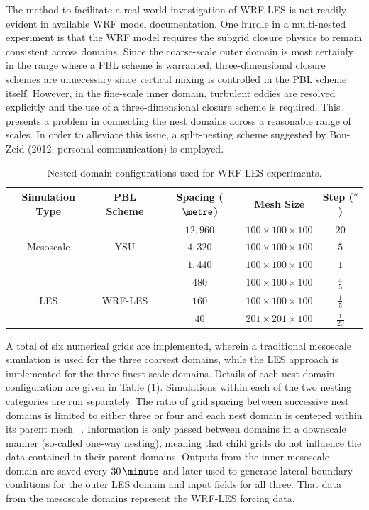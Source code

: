 The method to facilitate a real-world investigation of WRF-LES is not readily evident in available WRF model documentation. One hurdle in a multi-nested experiment is that the WRF model requires the subgrid closure physics to remain consistent across domains. Since the coarse-scale outer domain is most certainly in the range where a PBL scheme is warranted, three-dimensional closure schemes are unnecessary since vertical mixing is controlled in the PBL scheme itself. However, in the fine-scale inner domain, turbulent eddies are resolved explicitly and the use of a three-dimensional closure scheme is required. This presents a problem in connecting the nest domains across a reasonable range of scales. In order to alleviate this issue, a split-nesting scheme suggested by Bou-Zeid (2012, personal communication) is employed.


\begin{center}
\begin{table}[t]
\caption{Nested domain configurations used for WRF-LES experiments.}
\begin{center}
\begin{tabular}{  c  c  c  c  c }
\hline
\hline
\textbf{Simulation Type} & \textbf{PBL Scheme} & \textbf{Spacing ($\metre$)} & \textbf{Mesh Size} & \textbf{Step ($\second$)} \\ 
\hline
\multirow{3}{*}{Mesoscale} & & $12,960$ & $100\times100\times100$ & $20$ \\   
& YSU & $4,320$ & $100\times100\times100$ & $5$ \\
& & $1,440$ & $100\times100\times100$ & $1$ \\
\hline
\multirow{3}{*}{LES} &  & $480$ & $100\times100\times100$ & $\frac{4}{5}$ \\   
& WRF-LES & $160$ & $100\times100\times100$ & $\frac{1}{5}$ \\
&  & $40$ & $201\times201\times100$ & $\frac{1}{20}$ \\  
\hline
\hline
\end{tabular}
\end{center}
\label{table601}
\end{table}
\end{center}


A total of six numerical grids are implemented, wherein a traditional mesoscale simulation is used for the three coarsest domains, while the LES approach is implemented for the three finest-scale domains. Details of each nest domain configuration are given in Table (\ref{table601}). Simulations within each of the two nesting categories are run separately. The ratio of grid spacing between successive nest domains is limited to either three or four and each nest domain is centered within its parent mesh ~\citep{Skamarock}. Information is only passed between domains in a downscale manner (so-called one-way nesting), meaning that child grids do not influence the data contained in their parent domains. Outputs from the inner mesoscale domain are saved every $30 \, \minute$ and later used to generate lateral boundary conditions for the outer LES domain and input fields for all three. That data from the mesoscale domains represent the WRF-LES forcing data. 

